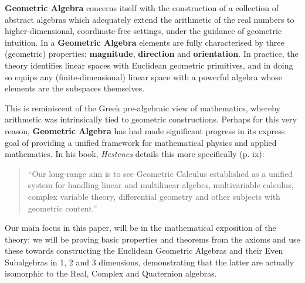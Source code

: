 \textbf{Geometric Algebra} concerns itself with the construction of a collection of abstract algebras which adequately extend the arithmetic of the real numbers to higher-dimensional, coordinate-free settings, under the guidance of geometric intuition. In a \textbf{Geometric Algebra} elements are fully characterised by three (geometric) properties: \textbf{magnitude}, \textbf{direction} and \textbf{orientation}. In practice, the theory identifies linear spaces with Euclidean geometric primitives, and in doing so equips any (finite-dimensional) linear space with a powerful algebra whose elements are the subspaces themselves.

This is reminiscent of the Greek pre-algebraic view of mathematics, whereby arithmetic was intrinsically tied to geometric constructions. 
Perhaps for this very reason, \textbf{Geometric Algebra} has had made significant progress in its express goal of providing a unified framework for mathematical physics and applied mathematics. In his book, \textit{Hestenes} details this more specifically (p. ix)\cite{ga-origin}:

\begin{quote}
	``Our long-range aim is to see Geometric Calculus established as a unified system for handling linear and multilinear algebra, multivariable calculus, complex variable theory, differential geometry and other subjects with geometric content.''
\end{quote}

Our main focus in this paper, will be in the mathematical exposition of the theory: we will be proving basic properties and theorems from the axioms and use these towards constructing the Euclidean Geometric Algebras and their Even Subalgebras in 1, 2 and 3 dimensions, demonstrating that the latter are actually isomorphic to the Real, Complex and Quaternion algebras.
